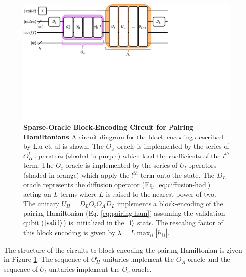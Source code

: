 \begin{figure}[h]
    \includegraphics[width=12cm]{figures/liu-construction.pdf}
    \caption{
        \textbf{Sparse-Oracle Block-Encoding Circuit for Pairing Hamiltonians}
        A circuit diagram for the block-encoding described by Liu et. al \cite{liu2024efficient} is shown.
        The $O_A$ oracle is implemented by the series of $O_H^l$ operators (shaded in purple) which load the coefficients of the $l^{th}$ term.
        The $O_c$ oracle is implemented by the series of $U_l$ operators (shaded in orange) which apply the $l^{th}$ term onto the state.
        The $D_L$ oracle represents the diffusion operator (Eq. \ref{eq:diffusion-had}) acting on $L$ terms where $L$ is raised to the nearest power of two.
        The unitary $U_H = D_L O_c O_A D_L$ implements a block-encoding of the pairing Hamiltonian (Eq. \ref{eq:pairing-ham}) assuming the validation qubit ($\ket{\text{valid}}$) is initialized in the $\ket{1}$ state.
        The rescaling factor of this block encoding is given by $\lambda = L \max_{ij} {|h_{ij}|}$.
    }
    \label{fig:liu-construction}
\end{figure}

The structure of the circuits to block-encoding the pairing Hamiltonian is given in Figure \ref{fig:liu-construction}.
The sequence of $O_H^l$ unitaries implement the $O_A$ oracle and the sequence of $U_l$ unitaries implement the $O_c$ oracle.

